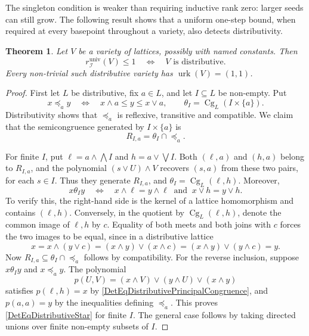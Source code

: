 \documentclass[12pt,english]{amsart}
\newtheorem{theorem}{Theorem}[section]
\theoremstyle{definition}
\numberwithin{equation}{section}
\theoremstyle{remark}
\begin{document}
The singleton condition is weaker than requiring inductive rank zero:
larger seeds can still grow. The following result shows that a uniform
one-step bound, when required at every basepoint throughout a variety,
also detects distributivity.

\begin{theorem}\label{DetThmLatticeUniversalRank}
Let $V$ be a variety of lattices, possibly with named constants. Then
\[
r_{\mathcal I}^{\mathrm{univ}}(V)\leqslant1
\quad\Longleftrightarrow\quad
V\text{ is distributive}.
\]
Every non-trivial such distributive variety has
$\operatorname{urk}(V)=(1,1)$.
\end{theorem}

\begin{proof}
First let $L$ be distributive, fix $a\in L$, and let $I\subseteq L$
be non-empty. Put
\[
x\preceq_a y\quad\Longleftrightarrow\quad
x\wedge a\leqslant y\leqslant x\vee a,
\qquad
\theta_I=\operatorname{Cg}_L(I\times\{a\}).
\]
Distributivity shows that $\preceq_a$ is reflexive, transitive and
compatible. We claim that the semicongruence generated by
$I\times\{a\}$ is
\begin{equation}\label{DetEqDistributiveStar}
R_{I,a}=\theta_I\cap\preceq_a.
\end{equation}

For finite $I$, put $\ell=a\wedge\bigwedge I$ and
$h=a\vee\bigvee I$. Both $(\ell,a)$ and $(h,a)$ belong to $R_{I,a}$,
and the polynomial $(s\vee U)\wedge V$ recovers $(s,a)$ from these two
pairs, for each $s\in I$. Thus they generate $R_{I,a}$, and
$\theta_I=\operatorname{Cg}_L(\ell,h)$. Moreover,
\begin{equation}\label{DetEqDistributivePrincipalCongruence}
x\mathrel{\theta_I}y
\quad\Longleftrightarrow\quad
x\wedge\ell=y\wedge\ell\ \text{ and }\ x\vee h=y\vee h.
\end{equation}
To verify this, the right-hand side is the kernel of a lattice
homomorphism and contains $(\ell,h)$. Conversely, in the quotient by
$\operatorname{Cg}_L(\ell,h)$, denote the common image of $\ell,h$ by
$c$. Equality of both meets and both joins with $c$ forces the two
images to be equal, since in a distributive lattice
\[
x=x\wedge(y\vee c)
=(x\wedge y)\vee(x\wedge c)
=(x\wedge y)\vee(y\wedge c)=y.
\]
Now $R_{I,a}\subseteq\theta_I\cap\preceq_a$ follows by compatibility.
For the reverse inclusion, suppose $x\mathrel{\theta_I}y$ and
$x\preceq_a y$. The polynomial
\[
p(U,V)=(x\wedge V)\vee(y\wedge U)\vee(x\wedge y)
\]
satisfies $p(\ell,h)=x$ by
\eqref{DetEqDistributivePrincipalCongruence}, and $p(a,a)=y$ by the
inequalities defining $\preceq_a$. This proves
\eqref{DetEqDistributiveStar} for finite $I$. The general case follows
by taking directed unions over finite non-empty subsets of $I$.


\end{proof}
\end{document}
